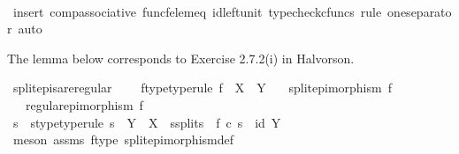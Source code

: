 \begin{isabellebody}
\ \ \ \ \ \ \isamarkupfalse%
\ {\isacharparenleft}{\kern0pt}insert\ comp{\isacharunderscore}{\kern0pt}associative{}\ func{\isacharunderscore}{\kern0pt}f{\isacharunderscore}{\kern0pt}elem{\isacharunderscore}{\kern0pt}eq\ id{\isacharunderscore}{\kern0pt}left{\isacharunderscore}{\kern0pt}unit{}{\isacharcomma}{\kern0pt}\ typecheck{\isacharunderscore}{\kern0pt}cfuncs{\isacharcomma}{\kern0pt}\ rule\ one{\isacharunderscore}{\kern0pt}separator{\isacharcomma}{\kern0pt}\ auto{\isacharparenright}{\kern0pt}\isanewline
\ \ \isamarkupfalse%
\isanewline
{}\isamarkupfalse%
%
\endisatagproof
{\isafoldproof}%
%
\isadelimproof
%
\endisadelimproof
%
\begin{isamarkuptext}%
The lemma below corresponds to Exercise 2.7.2(i) in Halvorson.%
\end{isamarkuptext}\isamarkuptrue%
\isamarkupfalse%
\ split{\isacharunderscore}{\kern0pt}epis{\isacharunderscore}{\kern0pt}are{\isacharunderscore}{\kern0pt}regular{\isacharcolon}{\kern0pt}\ \isanewline
\ \ \ f{\isacharunderscore}{\kern0pt}type{\isacharbrackleft}{\kern0pt}type{\isacharunderscore}{\kern0pt}rule{\isacharbrackright}{\kern0pt}{\isacharcolon}{\kern0pt}\ {\isachardoublequoteopen}f\ {\isacharcolon}{\kern0pt}\ X\ {\isasymrightarrow}\ Y{\isachardoublequoteclose}\isanewline
\ \ \ {\isachardoublequoteopen}split{\isacharunderscore}{\kern0pt}epimorphism\ f{\isachardoublequoteclose}\isanewline
\ \ \ {\isachardoublequoteopen}regular{\isacharunderscore}{\kern0pt}epimorphism\ f{\isachardoublequoteclose}\isanewline
%
\isadelimproof
%
\endisadelimproof
%
\isatagproof
{}\isamarkupfalse%
\ {\isacharminus}{\kern0pt}\ \isanewline
\ \ \isamarkupfalse%
\ s\ \ s{\isacharunderscore}{\kern0pt}type{\isacharbrackleft}{\kern0pt}type{\isacharunderscore}{\kern0pt}rule{\isacharbrackright}{\kern0pt}{\isacharcolon}{\kern0pt}\ {\isachardoublequoteopen}s\ {\isacharcolon}{\kern0pt}\ Y\ {\isasymrightarrow}\ X{\isachardoublequoteclose}\ \ s{\isacharunderscore}{\kern0pt}splits{\isacharcolon}{\kern0pt}\ \ {\isachardoublequoteopen}f\ {\isasymcirc}\isactrlsub c\ s\ {\isacharequal}{\kern0pt}\ id\ Y{\isachardoublequoteclose}\isanewline
\ \ \ \ \isamarkupfalse%
\ {\isacharparenleft}{\kern0pt}meson\ assms{\isacharparenleft}{\kern0pt}{}{\isacharparenright}{\kern0pt}\ f{\isacharunderscore}{\kern0pt}type\ split{\isacharunderscore}{\kern0pt}epimorphism{\isacharunderscore}{\kern0pt}def{}{\isacharparenright}{\kern0pt}\isanewline

\end{isabellebody}
